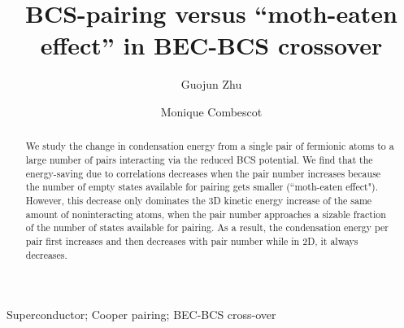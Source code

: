 \documentclass[5p,twocolumn]{elsarticle}
\begin{document}
\title{ BCS-pairing versus ``moth-eaten effect'' in BEC-BCS crossover}
\author[uiuc]{Guojun Zhu}
\author[uiuc,upmc]{Monique Combescot}
\address[uiuc]{Department of Physics, University of Illinois at Urbana-Champaign, 1110 W Green St, Urbana, IL, 61801}

\address[upmc]{Institut des NanoSciences de Paris, Universite Pierre et Marie Curie, CNRS, Tour 22, 4 place Jussieu, 75005 Paris }
\newcommand{\vk}{\ensuremath{\mathbf{k}}}
\providecommand{\vr}{\ensuremath{\mathbf{r}}}
\newcommand{\vp}{\ensuremath{\mathbf{p}}}


\providecommand{\comm}[1]{\textit{\scriptsize \uwave{(#1)}}}
\newcommand{\td}{{\ensuremath{{\text{(2D)}}}}}
\newcommand{\sd}{{\ensuremath{{\text{(3D)}}}}}
\newcommand{\Arctg}{\ensuremath{\text{Arctg}}}



\begin{abstract}
We study the change in condensation energy from a single pair of fermionic atoms to a large number of pairs interacting via the reduced BCS potential. We find that the energy-saving due to correlations decreases when the pair number increases because the number of empty states available for pairing gets smaller (``moth-eaten effect"). However, this decrease only dominates the 3D kinetic energy increase of the same amount of noninteracting atoms, when the pair number approaches a sizable fraction of the number of states available for pairing. As a result, the condensation energy per pair first increases and then decreases with pair number while in 2D, it always decreases.  
\end{abstract}
\begin{keyword}
Superconductor; Cooper pairing; BEC-BCS cross-over
\end{keyword}

\maketitle
\end{document}
